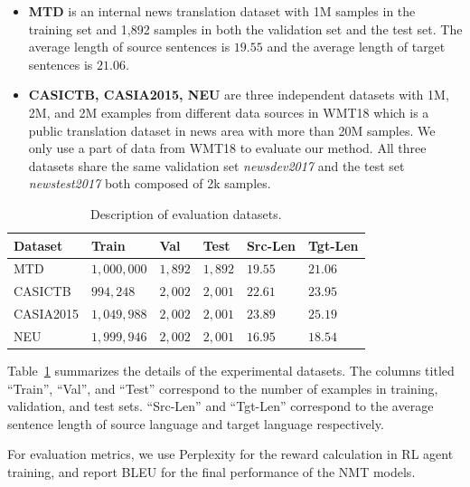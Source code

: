 \documentclass[letterpaper]{article}
\begin{document}
\begin{itemize}
	\item{\textbf{MTD}} is an internal news translation dataset with 1M samples in the training set and 1,892 samples in both the validation set and the test set. The average length of source sentences is $19.55$ and the average length of target sentences is $21.06$. 
	\item{\textbf{CASICTB, CASIA2015, NEU}} are three independent datasets with 1M, 2M, and 2M examples from different data sources in WMT18 which is a public translation dataset in news area with more than 20M samples. We only use a part of data from WMT18 to evaluate our method. All three datasets share the same validation set \emph{newsdev2017} and the test set \emph{newstest2017} both composed of 2k samples.
\end{itemize}

\begin{table}[tb]
  \resizebox{\columnwidth}{!}
  {
    \begin{threeparttable}
      \caption{Description of evaluation datasets.}
      \label{tab:datasets}
      \begin{tabular}{llllll}
        \toprule
        Dataset & Train & Val & Test & Src-Len & Tgt-Len\\
        \midrule
        MTD &  $1,000,000$ & $1,892$ & $1,892$ & $19.55$ & $21.06$\\
        CASICTB &  $994,248$ & $2,002$ & $2,001$  & $22.61$ & $23.95$\\
        CASIA2015 &  $1,049,988$ & $2,002$ & $2,001$  & $23.89$ & $25.19$\\
        NEU &  $1,999,946$ & $2,002$ & $2,001$  & $16.95$ & $18.54$\\
        \bottomrule
      \end{tabular}
    \end{threeparttable}
  }
\end{table}

Table~\ref{tab:datasets} summarizes the details of the experimental datasets. The columns titled ``Train'', ``Val'', and ``Test'' correspond to the number of examples in training, validation, and test sets. ``Src-Len'' and ``Tgt-Len'' correspond to the average sentence length of source language and target language respectively.

For evaluation metrics, we use Perplexity for the reward calculation in RL agent training, and report BLEU \cite{papineni2002bleu} for the final performance of the NMT models.
\end{document}
